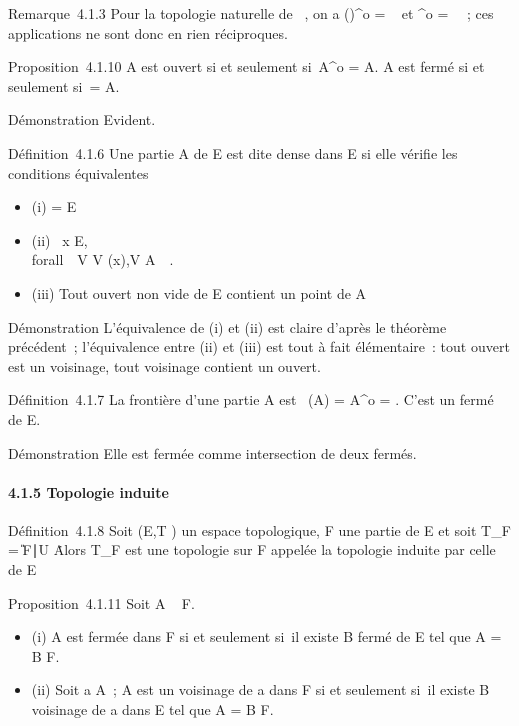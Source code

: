 \documentclass[]{article}
\begin{document}
Remarque~4.1.3 Pour la topologie naturelle de ~, on a
()^o = ~ et
^o = \varnothing~~; ces applications ne
sont donc en rien réciproques.

Proposition~4.1.10 A est ouvert si et seulement si~A^o = A. A
est fermé si et seulement si~\overlineA = A.

Démonstration Evident.

Définition~4.1.6 Une partie A de E est dite dense dans E si elle vérifie
les conditions équivalentes

\begin{itemize}
\itemsep1pt\parskip0pt
\item
  (i) \overlineA = E
\item
  (ii) \forall~x \in E, \\forall~~V \in
  V (x),\quad V \bigcap A\neq~\varnothing~.
\item
  (iii) Tout ouvert non vide de E contient un point de A
\end{itemize}

Démonstration L'équivalence de (i) et (ii) est claire d'après le
théorème précédent~; l'équivalence entre (ii) et (iii) est tout à fait
élémentaire~: tout ouvert est un voisinage, tout voisinage contient un
ouvert.

Définition~4.1.7 La frontière d'une partie A est
\mathrmFr~(A) =
\overlineA \diagdown A^o =
\overlineA \bigcap\overlinecA. C'est un
fermé de E.

Démonstration Elle est fermée comme intersection de deux fermés.

\paragraph{4.1.5 Topologie induite}

Définition~4.1.8 Soit (E,T ) un espace topologique, F une partie de E et
soit T\_F = \U \bigcap F∣U
\inT\. Alors T\_F est une topologie sur F appelée
la topologie induite par celle de E

Proposition~4.1.11 Soit A \subset~ F.

\begin{itemize}
\itemsep1pt\parskip0pt
\item
  (i) A est fermée dans F si et seulement si~il existe B fermé de E tel
  que A = B \bigcap F.
\item
  (ii) Soit a \in A~; A est un voisinage de a dans F si et seulement si~il
  existe B voisinage de a dans E tel que A = B \bigcap F.
\end{itemize}
\end{document}
